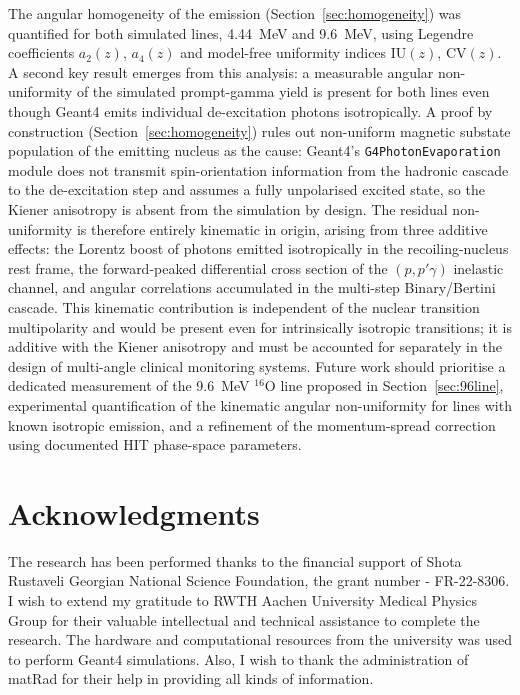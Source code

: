 \documentclass[a4paper]{article}
\begin{document}
The angular homogeneity of the emission (Section~\ref{sec:homogeneity}) was quantified for both simulated lines, 4.44~MeV and 9.6~MeV, using Legendre coefficients $a_2(z)$, $a_4(z)$ and model-free uniformity indices $\mathrm{IU}(z)$, $\mathrm{CV}(z)$. A second key result emerges from this analysis: a measurable angular non-uniformity of the simulated prompt-gamma yield is present for both lines even though Geant4 emits individual de-excitation photons isotropically. A proof by construction (Section~\ref{sec:homogeneity}) rules out non-uniform magnetic substate population of the emitting nucleus as the cause: Geant4's \texttt{G4PhotonEvaporation} module does not transmit spin-orientation information from the hadronic cascade to the de-excitation step and assumes a fully unpolarised excited state, so the Kiener anisotropy is absent from the simulation by design. The residual non-uniformity is therefore entirely kinematic in origin, arising from three additive effects: the Lorentz boost of photons emitted isotropically in the recoiling-nucleus rest frame, the forward-peaked differential cross section of the $(p,p'\gamma)$ inelastic channel, and angular correlations accumulated in the multi-step Binary/Bertini cascade. This kinematic contribution is independent of the nuclear transition multipolarity and would be present even for intrinsically isotropic transitions; it is additive with the Kiener anisotropy and must be accounted for separately in the design of multi-angle clinical monitoring systems. Future work should prioritise a dedicated measurement of the 9.6~MeV $^{16}$O line proposed in Section~\ref{sec:96line}, experimental quantification of the kinematic angular non-uniformity for lines with known isotropic emission, and a refinement of the momentum-spread correction using documented HIT phase-space parameters.

\section*{Acknowledgments}

The research has been performed thanks to the financial support of Shota Rustaveli Georgian National Science Foundation, the grant number - FR-22-8306.
I wish to extend my gratitude to RWTH Aachen University Medical Physics Group for their valuable intellectual and technical assistance to complete the research.
The hardware and computational resources from the university was used to perform Geant4 simulations.
Also, I wish to thank the administration of matRad for their help in providing all kinds of information.
\end{document}
